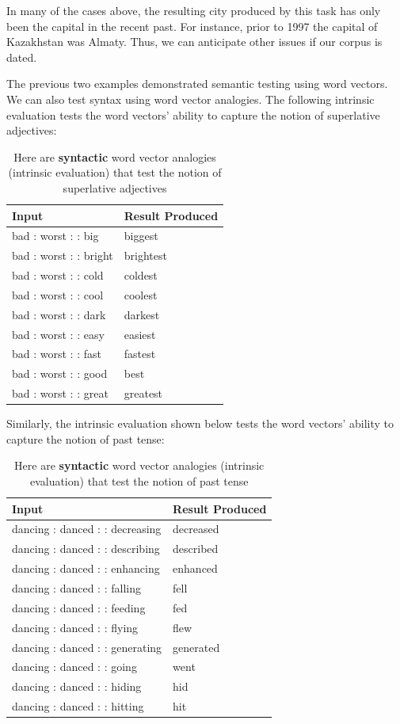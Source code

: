 \documentclass{tufte-handout}
\begin{document}
In many of the cases above, the resulting city produced by this task has only been the capital in the recent past. For instance, prior to 1997 the capital of Kazakhstan was Almaty. Thus, we can anticipate other issues if our corpus is dated.

The previous two examples demonstrated semantic testing using word vectors. We can also test syntax using word vector analogies. The following intrinsic evaluation tests the word vectors' ability to capture the notion of superlative adjectives:

\begin{table}[ht]
  \centering
  \selectfont
  \begin{tabular}{ll}
    \toprule
    Input & Result Produced \\
    \midrule
	bad : worst : : big & biggest\\
	bad : worst : : bright & brightest \\
	bad : worst : : cold & coldest \\
	bad : worst : : cool & coolest \\
	bad : worst : : dark & darkest \\
	bad : worst : : easy & easiest \\
	bad : worst : : fast & fastest\\
	bad : worst : : good & best\\
	bad : worst : : great & greatest\\
    \bottomrule
  \end{tabular}
  \caption{Here are \textbf{syntactic} word vector analogies (intrinsic evaluation) that test the notion of superlative adjectives}
  \label{tab:normaltab}
\end{table}

Similarly, the intrinsic evaluation shown below tests the word vectors' ability to capture the notion of past tense:

\begin{table}[ht]
  \centering
  \selectfont
  \begin{tabular}{ll}
    \toprule
    Input & Result Produced \\
    \midrule
	dancing : danced : : decreasing & decreased \\
	dancing : danced : : describing & described \\
	dancing : danced : : enhancing & enhanced \\
	dancing : danced : : falling & fell\\
	dancing : danced : : feeding & fed\\
	dancing : danced : : flying & flew\\
	dancing : danced : : generating & generated \\
	dancing : danced : : going & went\\
	dancing : danced : : hiding & hid\\
	dancing : danced : : hitting & hit\\
    \bottomrule
  \end{tabular}
  \caption{Here are \textbf{syntactic} word vector analogies (intrinsic evaluation) that test the notion of past tense}
  \label{tab:normaltab}
\end{table}
\end{document}
